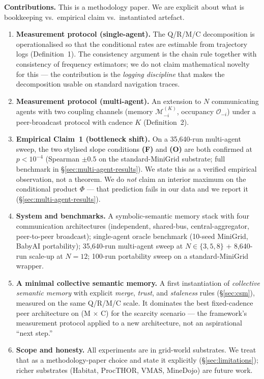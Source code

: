 \documentclass{article}
\begin{document}
\textbf{Contributions.} This is a methodology paper. We are explicit about what is bookkeeping vs.\ empirical claim vs.\ instantiated artefact.
\begin{enumerate}[leftmargin=20pt,itemsep=2pt,topsep=2pt]
\item \textbf{Measurement protocol (single-agent).} The Q/R/M/C decomposition is operationalised so that the conditional rates are estimable from trajectory logs (Definition~1). The consistency argument is the chain rule together with consistency of frequency estimators; we do not claim mathematical novelty for this --- the contribution is the \emph{logging discipline} that makes the decomposition usable on standard navigation traces.

\item \textbf{Measurement protocol (multi-agent).} An extension to $N$ communicating agents with two coupling channels (memory $\mathcal{M}_{-i}^{(K)}$, occupancy $\mathcal{O}_{-i}$) under a peer-broadcast protocol with cadence $K$ (Definition~2).

\item \textbf{Empirical Claim~1 (bottleneck shift).} On a 35{,}640-run multi-agent sweep, the two stylised slope conditions \textbf{(F)} and \textbf{(O)} are both confirmed at $p<10^{-4}$ (Spearman $\pm 0.5$ on the standard-MiniGrid substrate; full benchmark in \S\ref{sec:multi-agent-results}). We state this as a verified empirical observation, not a theorem. We do \emph{not} claim an interior maximum on the conditional product $\Phi$ --- that prediction fails in our data and we report it (\S\ref{sec:multi-agent-results}).

\item \textbf{System and benchmarks.} A symbolic-semantic memory stack with four communication architectures (independent, shared-bus, central-aggregator, peer-to-peer broadcast); single-agent oracle benchmark (10-seed MiniGrid, BabyAI portability); 35{,}640-run multi-agent sweep at $N\!\in\!\{3,5,8\}$ + 8{,}640-run scale-up at $N\!=\!12$; 100-run portability sweep on a standard-MiniGrid wrapper.

\item \textbf{A minimal collective semantic memory.} A first instantiation of \emph{collective semantic memory} with explicit \emph{merge}, \emph{trust}, and \emph{staleness} rules (\S\ref{sec:csm}), measured on the same Q/R/M/C scale. It dominates the best fixed-cadence peer architecture on (M$\,\times\,$C) for the scarcity scenario --- the framework's measurement protocol applied to a new architecture, not an aspirational ``next step.''

\item \textbf{Scope and honesty.} All experiments are in grid-world substrates. We treat that as a methodology-paper choice and state it explicitly (\S\ref{sec:limitations}); richer substrates (Habitat, ProcTHOR, VMAS, MineDojo) are future work.
\end{enumerate}
\end{document}
